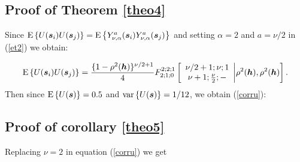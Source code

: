 \documentclass[times,sort&compress,3p]{elsarticle}
\theoremstyle{plain}%
\theoremstyle{definition}
\def\ss{\bm{s}}
\def\EE{{\rm E}}
\def\VV{{\rm var}}
\def\hh{\bm{h}}
\begin{document}
\subsection*{Proof of Theorem \ref{theo4}}\label{proof_theo4}

\noindent Since $\EE\left\{U(\ss_i)U(\ss_j)\right\}=\EE\left\{Y_{\nu,\alpha}^a(\ss_i)Y_{\nu,\alpha}^a(\ss_j)\right\}$ and     setting $\alpha=2$ and $a=\nu/2$ in (\ref{et2}) we obtain:

\begin{equation*}
\EE\left\{U(\ss_i)U(\ss_j)\right\}=\frac{ \{1-\rho^2(\hh)\}^{\nu/2+1}}{4}
F_{2;1;0}^{2;2;1}\left[ \begin{array}{c}
                                  \nu/2+1;\nu;1\\
                                  \nu+1;\frac{\nu}{2};-
                                \end{array}\middle\vert \rho^{2}(\hh),\rho^{2}(\hh)\right].
\end{equation*}
Then since  $\EE\left\{U(\ss)\right\}=0.5$ and $\VV\left\{U(\ss)\right\}=1/12$, we obtain ({\ref{corru}}):



\subsection*{Proof of corollary \ref{theo5}}\label{proof_theo5}

\noindent Replacing $\nu=2$ in  equation (\ref{corru})  we get
\end{document}
